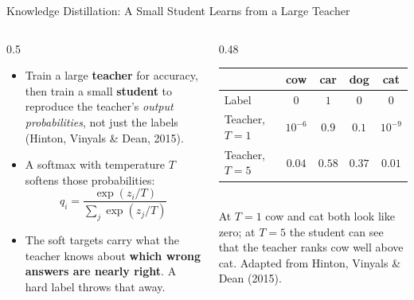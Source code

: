 \begin{frame}{Knowledge Distillation: A Small Student Learns from a Large Teacher}

    \begin{columns}[T]
        \begin{column}{0.5\textwidth}
            \begin{itemize}
                \small
                \item Train a large \textbf{teacher} for accuracy, then train a small \textbf{student} to
                      reproduce the teacher's \emph{output probabilities}, not just the labels (Hinton,
                      Vinyals \& Dean, 2015).
                \item A softmax with temperature $T$ softens those probabilities:
                      \[
                          q_i = \frac{\exp(z_i / T)}{\sum_j \exp(z_j / T)}
                      \]
                \item The soft targets carry what the teacher knows about \textbf{which wrong answers are
                      nearly right}. A hard label throws that away.
            \end{itemize}
        \end{column}
        \begin{column}{0.48\textwidth}
            \centering
            \setlength{\tabcolsep}{0.3em}
            \renewcommand{\arraystretch}{1.2}
            \begin{tabular}{l|cccc}
                & \footnotesize cow & \footnotesize car & \footnotesize dog & \footnotesize cat \\
                \hline
                \footnotesize Label          & $0$        & $1$    & $0$    & $0$ \\
                \footnotesize Teacher, $T{=}1$ & $10^{-6}$ & $0.9$  & $0.1$  & $10^{-9}$ \\
                \footnotesize Teacher, $T{=}5$ & $0.04$    & $0.58$ & $0.37$ & $0.01$ \\
            \end{tabular}\\[0.5em]
            {\scriptsize At $T{=}1$ cow and cat both look like zero; at $T{=}5$ the student can see that the
            teacher ranks cow well above cat. Adapted from Hinton, Vinyals \& Dean (2015).}
        \end{column}
    \end{columns}

\end{frame}

